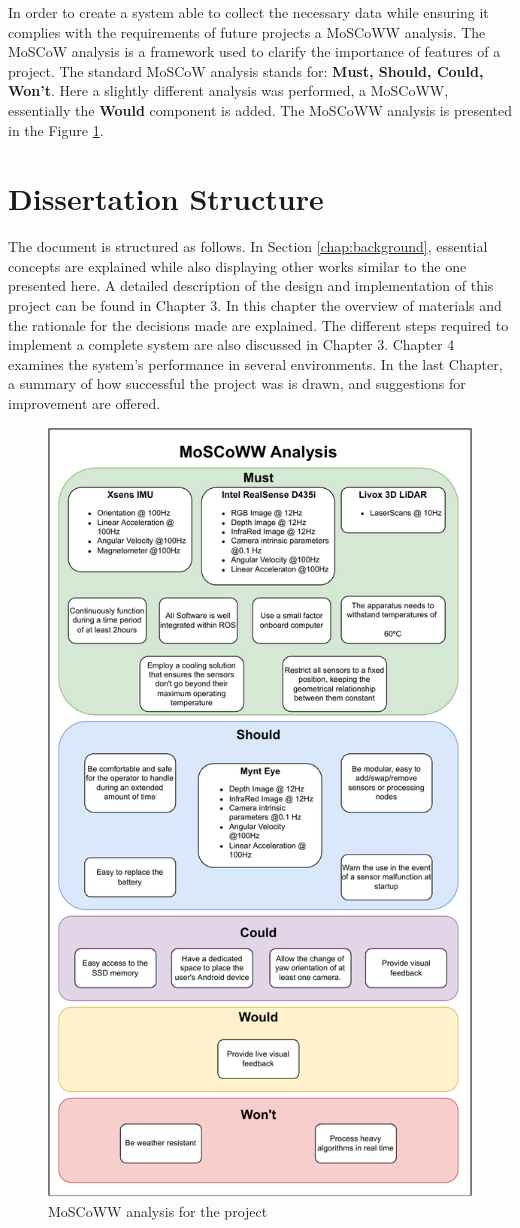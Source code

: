 In order to create a system able to collect the necessary data while ensuring it complies with the requirements of future projects a MoSCoWW analysis. The MoSCoW analysis is a framework used to clarify the importance of features of a project. The standard MoSCoW analysis stands for: \textbf{Must, Should, Could, Won't}. Here a slightly different analysis was performed, a MoSCoWW, essentially the \textbf{Would} component is added. The MoSCoWW analysis is presented in the Figure \ref*{fig: moscoww}.

\section{Dissertation Structure}
The document is structured as follows. In Section \ref*{chap:background}, essential concepts are explained while also displaying other works similar to the one presented here. A detailed description of the design and implementation of this project can be found in Chapter 3. In this chapter the overview of materials and the rationale for the decisions made are explained. The different steps required to implement a complete system are also discussed in Chapter 3. Chapter 4 examines the system's performance in several environments. In the last Chapter, a summary of how successful the project was is drawn, and suggestions for improvement are offered.

\begin{figure}[]
    \centering
    \includegraphics[width=0.65\linewidth]{images/introduction/moscoww_analysis.pdf}
    \caption{MoSCoWW analysis for the project}
    \label{fig: moscoww}
\end{figure}